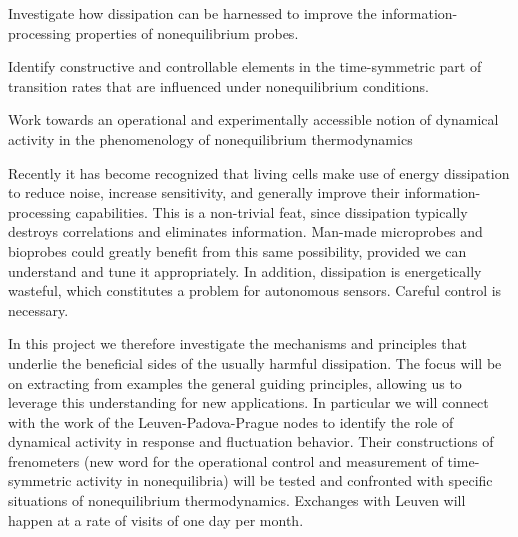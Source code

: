\begin{workpackage}[id=WPdissipation,wphases=0-48,
short=Dissipation,
title=Harnessing dissipation,
lead=TUE,
TUERM=36,
KULRM=6]

\begin{wpobjectives}
\begin{compactitem}
\item Investigate how dissipation can be harnessed to improve the information-processing properties of nonequilibrium probes.
\item Identify constructive and controllable elements in the time-symmetric part of transition rates that are influenced under nonequilibrium conditions.
\item Work towards an operational and experimentally accessible notion of dynamical activity in the phenomenology of nonequilibrium thermodynamics
\end{compactitem}
\end{wpobjectives}

\begin{wpdescription}
Recently it has become recognized that living cells make use of energy dissipation to reduce noise, increase sensitivity, and generally improve their information-processing capabilities. This is a non-trivial feat, since dissipation typically destroys correlations and eliminates information. Man-made microprobes and bioprobes could greatly benefit from this same possibility, provided we can understand and tune it appropriately. In addition, dissipation is energetically wasteful, which constitutes a problem for autonomous sensors. Careful control is necessary. 

In this project we therefore investigate the mechanisms and principles that underlie the beneficial sides of the usually harmful dissipation. The focus will be on extracting from examples the general guiding principles, allowing us to leverage this understanding for new applications.  In particular we will connect with the work of the Leuven-Padova-Prague nodes to identify the role of dynamical activity in response and fluctuation behavior.
Their constructions of frenometers (new word for the operational control and measurement of time-symmetric activity in nonequilibria) will be tested and confronted with specific situations of nonequilibrium thermodynamics.
Exchanges with Leuven will happen at a rate of visits of one day per month.


\end{wpdescription}
\end{workpackage}
